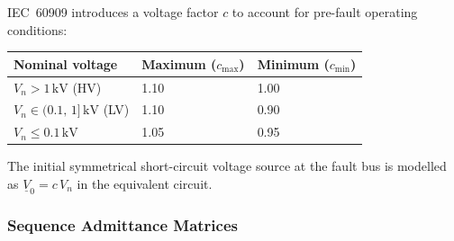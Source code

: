 IEC~60909 introduces a voltage factor $c$ to account for pre-fault
operating conditions:
\begin{center}
\begin{tabular}{lll}
\hline\hline
\textbf{Nominal voltage} & \textbf{Maximum ($c_{\max}$)} & \textbf{Minimum ($c_{\min}$)} \\
\hline
$V_n > 1\,\text{kV}$ (HV)           & 1.10 & 1.00 \\
$V_n \in (0.1,\,1]\,\text{kV}$ (LV) & 1.10 & 0.90 \\
$V_n \le 0.1\,\text{kV}$            & 1.05 & 0.95 \\
\hline\hline
\end{tabular}
\end{center}
The initial symmetrical short-circuit voltage source at the fault bus
is modelled as $\underline{V}_0 = c\,V_n$ in the equivalent circuit.

\subsubsection{Sequence Admittance Matrices}

